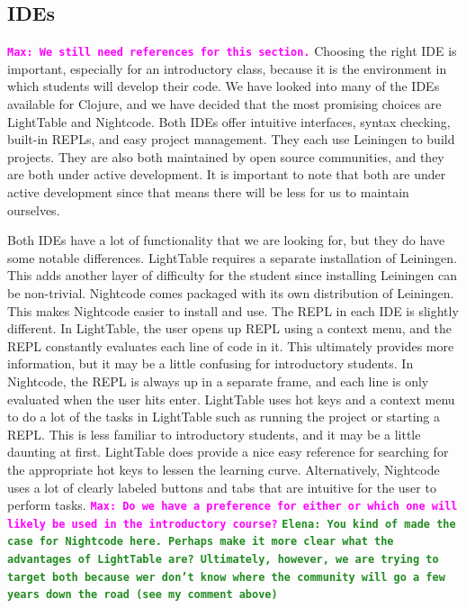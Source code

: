\documentclass[12pt]{article}
\newcommand{\comment}[1]{{\bf \tt  {#1}}}
\newcommand{\emcomment}[1]{\textcolor{ForestGreen}{\comment{Elena: {#1}}}}
\newcommand{\mmcomment}[1]{\textcolor{magenta}{\comment{Max: {#1}}}}
\begin{document}
\subsection{IDEs}
\mmcomment{We still need references for this section.}
Choosing the right IDE is important, especially for an introductory class, because it is the environment in which students will develop their code. We have looked into many of the IDEs available for Clojure, and we have decided that the most promising choices are LightTable and Nightcode. Both IDEs offer intuitive interfaces, syntax checking, built-in REPLs, and easy project management. They each use Leiningen to build projects. They are also both maintained by open source communities, and they are both under active development. It is important to note that both are under active development since that means there will be less for us to maintain ourselves. 

Both IDEs have a lot of functionality that we are looking for, but they do have some notable differences. LightTable %
requires a separate installation of Leiningen. %
This adds another layer of difficulty for the student since installing Leiningen can be non-trivial. Nightcode comes packaged with its own distribution of Leiningen. This makes Nightcode easier to install and use. The REPL in each IDE is slightly different. In LightTable, the user opens up REPL using a context menu, and the REPL constantly evaluates each line of code in it. This ultimately provides more information, but it may be a little confusing for introductory students. In Nightcode, the REPL is always up in a separate frame, and each line is only evaluated when the user hits enter. LightTable uses hot keys and a context menu to do a lot of the tasks in LightTable such as running the project or starting a REPL. This is less familiar to introductory students, and it may be a little daunting at first. LightTable does provide a nice easy reference for searching for the appropriate hot keys to lessen the learning curve. Alternatively, Nightcode uses a lot of clearly labeled buttons and tabs that are intuitive for the user to perform tasks. \mmcomment{Do we have a preference for either or which one will likely be used in the introductory course?} 
\emcomment{You kind of made the case for Nightcode here. Perhaps make it more clear what the advantages of LightTable are? Ultimately, however, we are trying to target both because wer don't know where the community will go a few years down the road (see my comment above)}
\end{document}
